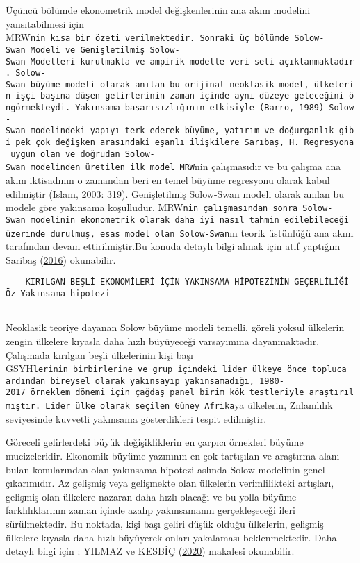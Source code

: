 \documentclass[
  12pt,
]{article}
\begin{document}
Üçüncü bölümde ekonometrik model değişkenlerinin ana akım modelini yansıtabilmesi için MRW\texttt{nin\ kısa\ bir\ özeti\ verilmektedir.\ Sonraki\ üç\ bölümde\ Solow-Swan\ Modeli\ ve\ Genişletilmiş\ Solow-Swan\ Modelleri\ kurulmakta\ ve\ ampirik\ modelle\ veri\ seti\ açıklanmaktadır.\ Solow-Swan\ büyüme\ modeli\ olarak\ anılan\ bu\ orijinal\ neoklasik\ model,\ ülkelerin\ işçi\ başına\ düşen\ gelirlerinin\ zaman\ içinde\ aynı\ düzeye\ geleceğini\ öngörmekteydi.\ Yakınsama\ başarısızlığının\ etkisiyle\ (Barro,\ 1989)\ Solow-Swan\ modelindeki\ yapıyı\ terk\ ederek\ büyüme,\ yatırım\ ve\ doğurganlık\ gibi\ pek\ çok\ değişken\ arasındaki\ eşanlı\ ilişkilere\ Sarıbaş,\ H.\ Regresyona\ uygun\ olan\ ve\ doğrudan\ Solow-Swan\ modelinden\ üretilen\ ilk\ model\ MRW}nin çalışmasıdır ve bu çalışma ana akım iktisadının o zamandan beri en temel büyüme regresyonu olarak kabul edilmiştir (Islam, 2003: 319).
Genişletilmiş Solow-Swan modeli olarak anılan bu modele göre yakınsama koşulludur.
MRW\texttt{nin\ çalışmasından\ sonra\ Solow-Swan\ modelinin\ ekonometrik\ olarak\ daha\ iyi\ nasıl\ tahmin\ edilebileceği\ üzerinde\ durulmuş,\ esas\ model\ olan\ Solow-Swan}ın teorik üstünlüğü ana akım tarafından devam ettirilmiştir.Bu konuda detaylı bilgi almak için atıf yaptığım Saribaş (\protect\hyperlink{ref-saribacs2016ana}{2016}) okunabilir.

\begin{verbatim}
    KIRILGAN BEŞLİ EKONOMİLERİ İÇİN YAKINSAMA HİPOTEZİNİN GEÇERLİLİĞİ  Öz Yakınsama hipotezi
    
\end{verbatim}

Neoklasik teoriye dayanan Solow büyüme modeli temelli, göreli yoksul ülkelerin zengin ülkelere kıyasla daha hızlı büyüyeceği varsayımına dayanmaktadır.
Çalışmada kırılgan beşli ülkelerinin kişi başı GSYH\texttt{lerinin\ birbirlerine\ ve\ grup\ içindeki\ lider\ ülkeye\ önce\ topluca\ ardından\ bireysel\ olarak\ yakınsayıp\ yakınsamadığı,\ 1980-2017\ örneklem\ dönemi\ için\ çağdaş\ panel\ birim\ kök\ testleriyle\ araştırılmıştır.\ Lider\ ülke\ olarak\ seçilen\ Güney\ Afrika}ya ülkelerin, Znlamlılık seviyesinde kuvvetli yakınsama gösterdikleri tespit edilmiştir.

Göreceli gelirlerdeki büyük değişikliklerin en çarpıcı örnekleri büyüme mucizeleridir.
Ekonomik büyüme yazınının en çok tartışılan ve araştırma alanı bulan konularından olan yakınsama hipotezi aslında Solow modelinin genel çıkarımıdır.
Az gelişmiş veya gelişmekte olan ülkelerin verimlilikteki artışları, gelişmiş olan ülkelere nazaran daha hızlı olacağı ve bu yolla büyüme farklılıklarının zaman içinde azalıp yakınsamanın gerçekleşeceği ileri sürülmektedir.
Bu noktada, kişi başı geliri düşük olduğu ülkelerin, gelişmiş ülkelere kıyasla daha hızlı büyüyerek onları yakalaması beklenmektedir. Daha detaylı bilgi için : YILMAZ ve KESBİÇ (\protect\hyperlink{ref-yilmaz2020kirilgan}{2020}) makalesi okunabilir.
\end{document}
